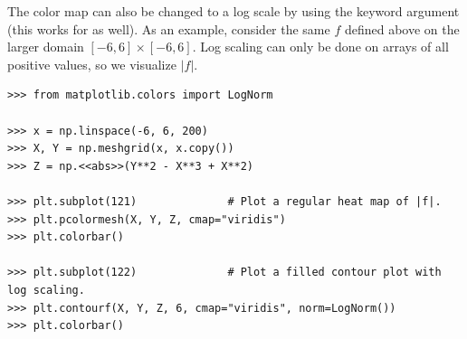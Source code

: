 The color map can also be changed to a log scale by using the keyword argument  (this works for  as well).
As an example, consider the same $f$ defined above on the larger domain $[-6,6]\times [-6,6]$.
Log scaling can only be done on arrays of all positive values, so we visualize $|f|$.

\begin{lstlisting}
>>> from matplotlib.colors import LogNorm

>>> x = np.linspace(-6, 6, 200)
>>> X, Y = np.meshgrid(x, x.copy())
>>> Z = np.<<abs>>(Y**2 - X**3 + X**2)

>>> plt.subplot(121)              # Plot a regular heat map of |f|.
>>> plt.pcolormesh(X, Y, Z, cmap="viridis")
>>> plt.colorbar()

>>> plt.subplot(122)              # Plot a filled contour plot with log scaling.
>>> plt.contourf(X, Y, Z, 6, cmap="viridis", norm=LogNorm())
>>> plt.colorbar()
\end{lstlisting}

